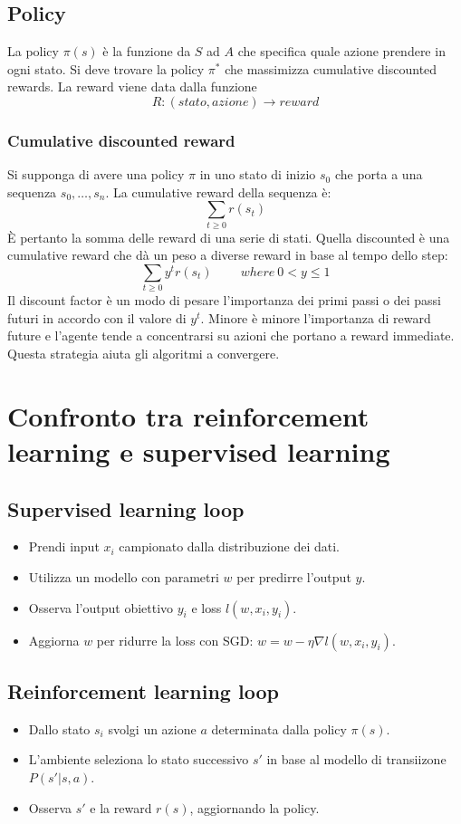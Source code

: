 	\subsection{Policy}
	La policy $\pi(s)$ \`e la funzione da $S$ ad $A$ che specifica quale azione prendere in ogni stato.
	Si deve trovare la policy $\pi^*$ che massimizza cumulative discounted rewards.
	La reward viene data dalla funzione
	$$R:(stato, azione)\rightarrow reward$$

		\subsubsection{Cumulative discounted reward}
		Si supponga di avere una policy $\pi$ in uno stato di inizio $s_0$ che porta a una sequenza $s_0,\dots, s_n$.
		La cumulative reward della sequenza \`e:
		$$\sum\limits_{t\ge 0} r(s_t)$$
		\`E pertanto la somma delle reward di una serie di stati.
		Quella discounted \`e una cumulative reward che d\`a un peso a diverse reward in base al tempo dello step:
		$$\sum\limits_{t\ge 0} y^tr(s_t)\qquad\ where\ 0 < y\le 1$$
		Il discount factor \`e un modo di pesare l'importanza dei primi passi o dei passi futuri in accordo con il valore di $y^t$.
		Minore \`e minore l'importanza di reward future e l'agente tende a concentrarsi su azioni che portano a reward immediate.
		Questa strategia aiuta gli algoritmi a convergere.

\section{Confronto tra reinforcement learning e supervised learning}

	\subsection{Supervised learning loop}
	\begin{itemize}
		\item Prendi input $x_i$ campionato dalla distribuzione dei dati.
		\item Utilizza un modello con parametri $w$ per predirre l'output $y$.
		\item Osserva l'output obiettivo $y_i$ e loss $l(w, x_i, y_i)$.
		\item Aggiorna $w$ per ridurre la loss con SGD: $w = w -\eta\nabla l(w, x_i, y_i)$.
	\end{itemize}

	\subsection{Reinforcement learning loop}
	\begin{itemize}
		\item Dallo stato $s_i$ svolgi un azione $a$ determinata dalla policy $\pi(s)$.
		\item L'ambiente seleziona lo stato successivo $s'$ in base al modello di transiizone $P(s'|s,a)$.
		\item Osserva $s'$ e la reward $r(s)$, aggiornando la policy.
	\end{itemize}

